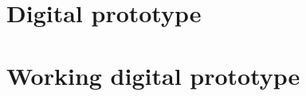 \section{Digital prototype}\label{appendix:tasklists:prototype2}




\section{Working digital prototype}\label{appendix:tasklists:prototype3}






